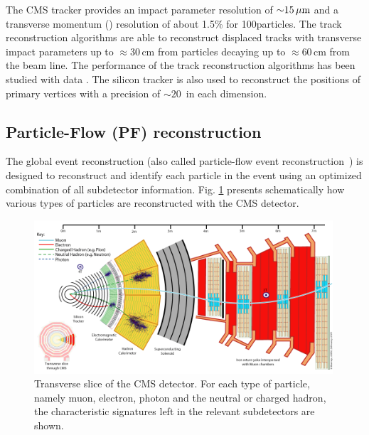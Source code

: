 The CMS tracker provides an impact parameter resolution of ${\sim}15\,\mu\text{m}$ and a transverse momentum (\pt) resolution of about 1.5\% for 100\GeV particles. 
The track reconstruction algorithms are able to reconstruct displaced tracks with transverse impact
parameters up to ${\approx}30$\,cm from particles decaying up to ${\approx}60$\,cm from the beam line.  The
performance of the track reconstruction algorithms has been studied with data
\cite{Khachatryan:2010pw}. 
The silicon
tracker is also used to reconstruct the positions of primary vertices with a
precision of ${\sim}20$~\mum in each dimension.

\subsection{Particle-Flow (PF) reconstruction}

The global event reconstruction (also called particle-flow event reconstruction~\cite{CMS-PAS-PFT-09-001,CMS-PAS-PFT-10-001}) is designed to reconstruct and identify each particle in the event using an optimized combination of all subdetector information.
Fig. \ref{fig:cmsslice} presents schematically how various types of particles are reconstructed
with the CMS detector.

\begin{figure}[htbp]
\centering
\includegraphics[width=0.99\textwidth]{plots/intro/CMS_Slice.png}
\caption{Transverse slice of the CMS detector. For each type of particle, namely muon, electron,
 photon and the neutral or charged hadron, the characteristic
signatures left in the relevant subdetectors are shown. \label{fig:cmsslice}}
\end{figure}
 
